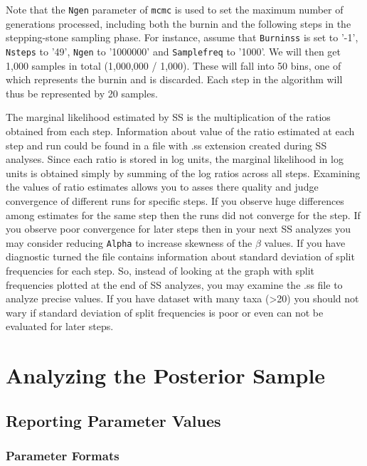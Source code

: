 \documentclass[12pt]{book}
\newcommand{\ttt}[1]{\texttt{#1} }
\begin{document}
Note that the \ttt{Ngen} parameter of \ttt{mcmc} is used to set the maximum number of generations
processed, including both the burnin and the following steps in the stepping-stone sampling phase.
For instance, assume that \ttt{Burninss} is set to '-1', \ttt{Nsteps} to '49', \ttt{Ngen} to
'1000000' and \ttt{Samplefreq} to '1000'.  We will then get 1,000 samples in total (1,000,000 /
1,000). These will fall into 50 bins, one of which represents the burnin and is discarded. Each
step in the algorithm will thus be represented by 20 samples.


The marginal likelihood estimated by SS is the multiplication of the ratios obtained from each
step.  Information about value of the ratio estimated at each step and run could be found in a file
with .ss extension created during SS analyses. Since each ratio is stored in log units, the
marginal likelihood in log units is obtained simply by summing of the log ratios across all steps.
Examining the values of ratio estimates allows you to asses there quality and judge convergence of
different runs for specific steps. If you observe huge differences among estimates for the same
step then the runs did not converge for the step. If you observe poor convergence for later steps
then in your next SS analyzes you may consider reducing \ttt{Alpha} to increase skewness of the
$\beta$ values.  If you have diagnostic turned the file contains information about standard
deviation of split frequencies for each step. So, instead of looking at the graph with split
frequencies plotted at the end of SS analyzes, you may examine the .ss file to analyze precise
values. If you have dataset with many taxa (>20) you should not wary if standard deviation of split
frequencies is poor or even can not be evaluated for later steps. 



\section{Analyzing the Posterior Sample}

\subsection{Reporting Parameter Values}

\subsubsection{Parameter Formats}
\end{document}

